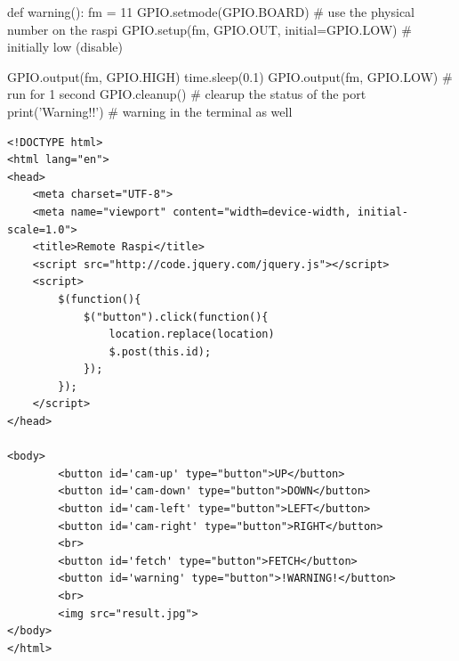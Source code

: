 \documentclass{article}
\begin{document}
\begin{appendices}
\begin{python}
def warning():
    fm = 11
    GPIO.setmode(GPIO.BOARD) # use the physical number on the raspi
    GPIO.setup(fm, GPIO.OUT, initial=GPIO.LOW) # initially low (disable)

    GPIO.output(fm, GPIO.HIGH)
    time.sleep(0.1)
    GPIO.output(fm, GPIO.LOW) # run for 1 second
    GPIO.cleanup()            # clearup the status of the port
    print('Warning!!')        # warning in the terminal as well
\end{python}

\begin{lstlisting}
<!DOCTYPE html>
<html lang="en">
<head>
    <meta charset="UTF-8">
    <meta name="viewport" content="width=device-width, initial-scale=1.0">
    <title>Remote Raspi</title>
    <script src="http://code.jquery.com/jquery.js"></script>
    <script>
        $(function(){
            $("button").click(function(){
                location.replace(location)
                $.post(this.id);
            });
        });
    </script>
</head>

<body>
        <button id='cam-up' type="button">UP</button>
        <button id='cam-down' type="button">DOWN</button>
        <button id='cam-left' type="button">LEFT</button>
        <button id='cam-right' type="button">RIGHT</button>
        <br>
        <button id='fetch' type="button">FETCH</button>
        <button id='warning' type="button">!WARNING!</button>
        <br>
        <img src="result.jpg">
</body>
</html>
\end{lstlisting}

\end{appendices}
\end{document}

